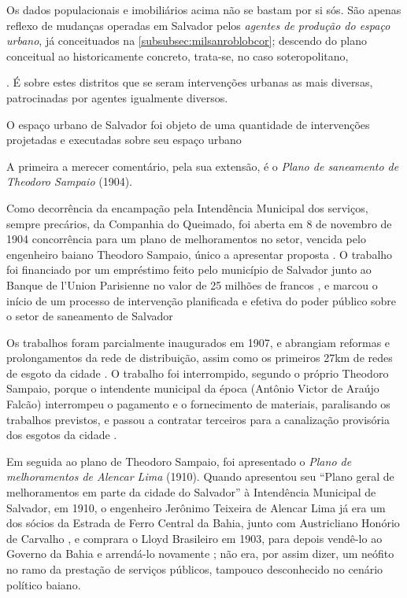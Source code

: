 Os dados populacionais e imobiliários acima não se bastam por si sós. São apenas reflexo de mudanças operadas em Salvador pelos \textit{agentes de produção do espaço urbano}, já conceituados na \autoref{subsubsec:milsanroblobcor}; descendo do plano conceitual ao historicamente concreto, trata-se, no caso soteropolitano, 

. É sobre estes distritos que se seram intervenções urbanas as mais diversas, patrocinadas por agentes igualmente diversos. 

O espaço urbano de Salvador foi objeto de uma quantidade de intervenções projetadas e executadas sobre seu espaço urbano 

A primeira a merecer comentário, pela sua extensão, é o \textit{Plano de saneamento de Theodoro Sampaio} (1904).

Como decorrência da encampação pela Intendência Municipal dos serviços, sempre precários, da Companhia do Queimado, foi aberta em 8 de novembro de 1904 concorrência para um plano de melhoramentos no setor, vencida pelo engenheiro baiano Theodoro Sampaio, único a apresentar proposta \cite[150]{gordilhobarbosa_eau_2004}. O trabalho foi financiado por um empréstimo feito pelo município de Salvador junto ao Banque de l'Union Parisienne no valor de 25 milhões de francos \cite[p.~150]{gordilhobarbosa_eau_2004}, e marcou o início de um processo de intervenção planificada e efetiva do poder público sobre o setor de saneamento de Salvador \cite[p.~150]{gordilhobarbosa_eau_2004} 

Os trabalhos foram parcialmente inaugurados em 1907, e abrangiam reformas e prolongamentos da rede de distribuição, assim como os primeiros 27km de redes de esgoto da cidade \cite[p.~151]{gordilhobarbosa_eau_2004}. O trabalho foi interrompido, segundo o próprio Theodoro Sampaio, porque o intendente municipal da época (Antônio Victor de Araújo Falcão) interrompeu o pagamento e o fornecimento de materiais, paralisando os trabalhos previstos, e passou a contratar terceiros para a canalização provisória dos esgotos da cidade \cite[p.~152]{gordilhobarbosa_eau_2004}.

Em seguida ao plano de Theodoro Sampaio, foi apresentado o \textit{Plano de melhoramentos de Alencar Lima} (1910). Quando apresentou seu ``Plano geral de melhoramentos em parte da cidade do Salvador'' à Intendência Municipal de Salvador, em 1910, o engenheiro Jerônimo Teixeira de Alencar Lima já era um dos sócios da Estrada de Ferro Central da Bahia, junto com Austricliano Honório de Carvalho \cite{souza_trabalholivre_2011}, e comprara o Lloyd Brasileiro em 1903, para depois vendê-lo ao Governo da Bahia e arrendá-lo novamente \cite[p.~220]{CUNHA2011}; não era, por assim dizer, um neófito no ramo da prestação de serviços públicos, tampouco desconhecido no cenário político baiano.

